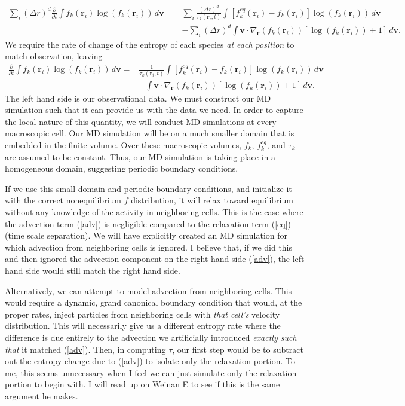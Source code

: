 \documentclass{article}
\begin{document}
\begin{align*}
\sum_i (\Delta r)^d\frac{\partial }{\partial t}\int f_k(\mathbf{r}_i)\log(f_k(\mathbf{r}_i))\,d\mathbf{v}=&\sum_i\frac{(\Delta r)^d}{\tau_{k}(\mathbf{r}_i,t)}\int [f^{eq}_{k}(\mathbf{r}_i)-f_k(\mathbf{r}_i)]\log(f_k(\mathbf{r}_i))\,d\mathbf{v}\\
&-\sum_i (\Delta r)^d\int \mathbf{v}\cdot \nabla_\mathbf{r}(f_k(\mathbf{r}_i))[\log(f_k(\mathbf{r}_i))+1]\,d\mathbf{v}.
\end{align*}We require the rate of change of the entropy of each species \emph{at each position} to match observation, leaving
\begin{align}
\frac{\partial }{\partial t}\int f_k(\mathbf{r}_i)\log(f_k(\mathbf{r}_i))\,d\mathbf{v}=&\frac{1}{\tau_{k}(\mathbf{r}_i,t)}\int [f^{eq}_{k}(\mathbf{r}_i)-f_k(\mathbf{r}_i)]\log(f_k(\mathbf{r}_i))\,d\mathbf{v}\label{eq}\\
&-\int \mathbf{v}\cdot \nabla_\mathbf{r}(f_k(\mathbf{r}_i))[\log(f_k(\mathbf{r}_i))+1]\,d\mathbf{v}\label{adv}.
\end{align}The left hand side is our observational data. We must construct our MD simulation such that it can provide us with the data we need. In order to capture the local nature of this quantity, we will conduct MD simulations at every macroscopic cell. Our MD simulation will be on a much smaller domain that is embedded in the finite volume. Over these macroscopic volumes, $f_k$, $f_k^{eq}$, and $\tau_k$ are assumed to be constant. Thus, our MD simulation is taking place in a homogeneous domain, suggesting periodic boundary conditions.

If we use this small domain and periodic boundary conditions, and initialize it with the correct nonequilibrium $f$ distribution, it will relax toward equilibrium without any knowledge of the activity in neighboring cells. This is the case where the advection term (\ref{adv}) is negligible compared to the relaxation term (\ref{eq}) (time scale separation). We will have explicitly created an MD simulation for which advection from neighboring cells is ignored. I believe that, if we did this and then ignored the advection component on the right hand side (\ref{adv}), the left hand side would still match the right hand side.

Alternatively, we can attempt to model advection from neighboring cells. This would require a dynamic, grand canonical boundary condition that would, at the proper rates, inject particles from neighboring cells with \emph{that cell's} velocity distribution. This will necessarily give us a different entropy rate where the difference is due entirely to the advection we artificially introduced \emph{exactly such that} it matched (\ref{adv}). Then, in computing $\tau$, our first step would be to subtract out the entropy change due to (\ref{adv}) to isolate only the relaxation portion. To me, this seems unnecessary when I feel we can just simulate only the relaxation portion to begin with. I will read up on Weinan E to see if this is the same argument he makes.
\end{document}

